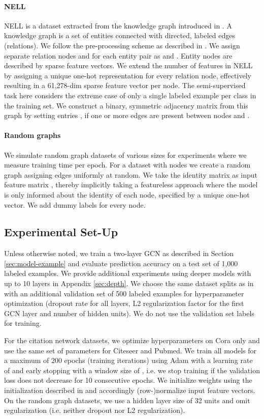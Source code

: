 \documentclass{article} \usepackage{iclr2017_conference,times}
\makeatletter
\newcommand*{\ie}{i.e.\@\xspace}
\makeatother
\begin{document}
\paragraph{NELL} NELL is a dataset extracted from the knowledge graph introduced in \citep{carlson2010toward}. A knowledge graph is a set of entities connected with directed, labeled edges (relations). We follow the pre-processing scheme as described in \cite{yang2016revisiting}. We assign separate relation nodes  and  for each entity pair  as  and . Entity nodes are described by sparse feature vectors. We extend the number of features in NELL by assigning a unique one-hot representation for every relation node, effectively resulting in a 61,278-dim sparse feature vector per node. The semi-supervised task here considers the extreme case of only a single labeled example per class in the training set. We construct a binary, symmetric adjacency matrix from this graph by setting entries , if one or more edges are present between nodes  and .

\paragraph{Random graphs} We simulate random graph datasets of various sizes for experiments where we measure training time per epoch. For a dataset with  nodes we create a random graph assigning  edges uniformly at random. We take the identity matrix  as input feature matrix , thereby implicitly taking a featureless approach where the model is only informed about the identity of each node, specified by a unique one-hot vector. We add dummy labels  for every node.

\subsection{Experimental Set-Up}
Unless otherwise noted, we train a two-layer GCN as described in Section \ref{sec:model-example} and evaluate prediction accuracy on a test set of 1,000 labeled examples. We provide additional experiments using deeper models with up to 10 layers in Appendix \ref{sec:depth}. We choose the same dataset splits as in \cite{yang2016revisiting} with an additional validation set of 500 labeled examples for hyperparameter optimization (dropout rate for all layers, L2 regularization factor for the first GCN layer and number of hidden units). We do not use the validation set labels for training.

For the citation network datasets, we optimize hyperparameters on Cora only and use the same set of parameters for Citeseer and Pubmed. We train all models for a maximum of 200 epochs (training iterations) using Adam \citep{kingma2014adam} with a learning rate of  and early stopping with a window size of , \ie we stop training if the validation loss does not decrease for 10 consecutive epochs. We initialize weights using the initialization described in \cite{glorot2010understanding} and accordingly (row-)normalize input feature vectors. On the random graph datasets, we use a hidden layer size of 32 units and omit regularization (\ie neither dropout nor L2 regularization).
\end{document}
